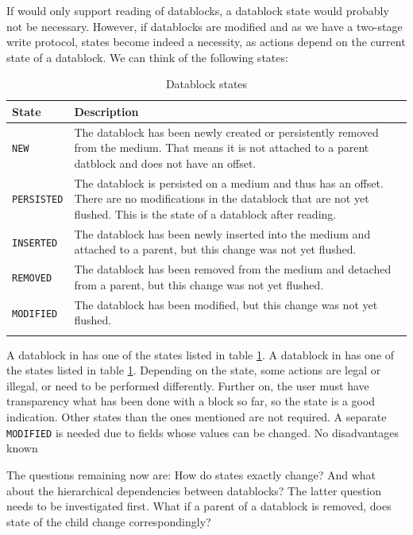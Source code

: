 If \LibName{} would only support reading of datablocks, a datablock state would probably not be necessary. However, if datablocks are modified and as we have a two-stage write protocol, states become indeed a necessity, as actions depend on the current state of a datablock. We can think of the following states:
\begin{longtable}{|p{}|p{}|} \hline
  \textbf{State} & \textbf{Description} \\ \endhead \hline
  \texttt{NEW} & The datablock has been newly created or persistently removed from the medium. That means it is not attached to a parent datblock and does not have an offset. \\
  \hline
  \texttt{PERSISTED} & The datablock is persisted on a medium and thus has an offset. There are no modifications in the datablock that are not yet flushed. This is the state of a datablock after reading. \\
  \hline
  \texttt{INSERTED} & The datablock has been newly inserted into the medium and attached to a parent, but this change was not yet flushed. \\
  \hline
  \texttt{REMOVED} & The datablock has been removed from the medium and detached from a parent, but this change was not yet flushed. \\
  \hline
  \texttt{MODIFIED} & The datablock has been modified, but this change was not yet flushed. \\
  \hline
  \caption{Datablock states}
  \label{tab:Datablockstates}
\end{longtable}

{%
A datablock in \LibName{} has one of the states listed in table \ref{tab:Datablockstates}.
}
{%
A datablock in \LibName{} has one of the states listed in table \ref{tab:Datablockstates}.
}
{%
Depending on the state, some actions are legal or illegal, or need to be performed differently. Further on, the user must have transparency what has been done with a block so far, so the state is a good indication. Other states than the ones mentioned are not required. A separate \texttt{MODIFIED} is needed due to fields whose values can be changed.
}
{%
No disadvantages known
}

The questions remaining now are: How do states exactly change? And what about the hierarchical dependencies between datablocks? The latter question needs to be investigated first. What if a parent of a datablock is removed, does state of the child change correspondingly?

